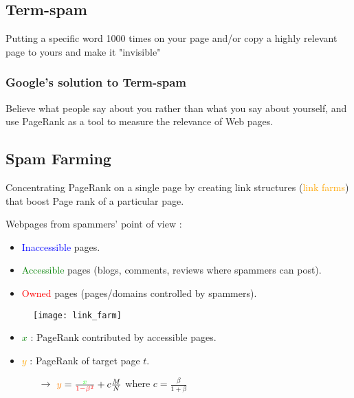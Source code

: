 \newpage
\subsection{Term-spam}

Putting a specific word 1000 times on your page and/or copy a highly relevant page to yours and make it "invisible"

\subsubsection{Google's solution to Term-spam}
Believe what people say about you rather than what you say about yourself, and use PageRank as a tool to measure the relevance of Web pages.


\subsection{Spam Farming}

Concentrating PageRank on a single page by creating link structures (\textcolor{orange}{link farms}) that boost Page rank of a particular page.

Webpages from spammers' point of view :
\begin{itemize}
\item \textcolor{blue}{Inaccessible} pages.
\item \textcolor{green}{Accessible} pages (blogs, comments, reviews where spammers can post).
\item \textcolor{red}{Owned} pages (pages/domains controlled by spammers).
\end{itemize}

\begin{figure}[H]
    \centering
    \texttt{[image: link\_farm]}
\end{figure}

\begin{itemize}
\item \textcolor{green}{$x$} : PageRank contributed by accessible pages.
\item \textcolor{orange}{$y$} : PageRank of target page $t$.
	\begin{itemize}
	\item[$\rightarrow$] $\textcolor{orange}{y} = \frac{\textcolor{green}{x}}{\textcolor{red}{1-\beta^2}} + c \frac{M}{N}$ where $c = \frac{\beta}{1 + \beta}$
	\end{itemize}
\end{itemize}


